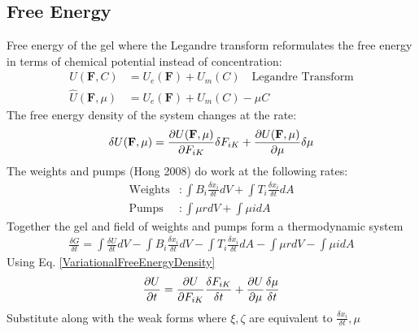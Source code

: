 \documentclass[12pt,3p]{article}
\numberwithin{equation}{section}
\begin{document}
\subsection{Free Energy}
Free energy of the gel where the Legandre transform reformulates the free energy in terms of chemical potential instead of concentration: 
\begin{align*}
U (\mathbf{F}, C) &= U_e (\mathbf{F}) + U_m (C) \quad \text{Legandre Transform} \\
\hat{U} (\mathbf{F}, \mu) &= U_e (\mathbf{F}) + U_m (C) - \mu C
\end{align*}
The free energy density of the system changes at the rate: 
\begin{equation}\label{VariationalFreeEnergyDensity}
\delta U (\mathbf{F}, \mu) = \pdv{U (\mathbf{F},\mu)}{F_{iK}} \delta F_{iK}+ \pdv{U (\mathbf{F},\mu)}{\mu} \delta \mu
\end{equation}
The weights and pumps (Hong 2008) do work at the following rates:
\begin{align*}
\text{Weights}&: \int B_i \frac{\delta x_i}{\delta t} dV+ \int T_i \frac{\delta x_i}{\delta t} dA \\
\text{Pumps}&: \int \mu r dV + \int \mu i dA
\end{align*}
Together the gel and field of weights and pumps form a thermodynamic system
\begin{align}
\frac{\delta G}{\delta t} = \int \frac{\delta U}{\delta t} dV - \int B_i \frac{\delta x_i}{\delta t} dV - \int T_i \frac{\delta x_i}{\delta t} dA - \int \mu r dV - \int \mu i dA
\end{align}
Using Eq. \ref{VariationalFreeEnergyDensity}
\begin{align*}
\pdv{U}{t} = \pdv{U}{F_{iK}} \frac{\delta F_{iK}}{\delta t} + \pdv{U}{\mu} \frac{\delta \mu}{\delta t} 
\end{align*}
Substitute along with the weak forms where $\xi, \zeta$ are equivalent to $\frac{\delta x_i}{\delta t}, \mu$
\end{document}
